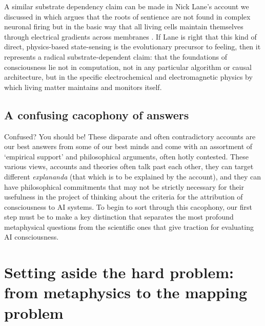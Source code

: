 \documentclass[11pt, a4paper, onecolumn, gdm]{google}
\begin{document}
A similar substrate dependency claim can be made in Nick Lane's account we discussed in  which argues that the roots of sentience are not found in complex neuronal firing but in the basic way that all living cells maintain themselves through electrical gradients across membranes \citep{lane2022}.
If Lane is right that this kind of direct, physics-based state-sensing is the evolutionary precursor to feeling, then it represents a radical substrate-dependent claim: that the foundations of consciousness lie not in computation, not in any particular algorithm or causal architecture, but in the specific electrochemical and electromagnetic physics by which living matter maintains and monitors itself.

\subsection*{A confusing cacophony of answers}\label{a-confusing-cacophony-of-answers}

Confused?
You should be!
These disparate and often contradictory accounts are our best answers from some of our best minds and come with an assortment of `empirical support' and philosophical arguments, often hotly contested.
These various views, accounts and theories often talk past each other, they can target different \emph{explananda} (that which is to be explained by the account), and they can have philosophical commitments that may not be strictly necessary for their usefulness in the project of thinking about the criteria for the attribution of consciousness to AI systems.
To begin to sort through this cacophony, our first step must be to make a key distinction that separates the most profound metaphysical questions from the scientific ones that give traction for evaluating AI consciousness.

\section{Setting aside the hard problem: from metaphysics to the mapping problem}\label{setting-aside-the-hard-problem-from-metaphysics-to-the-mapping-problem}
\end{document}
